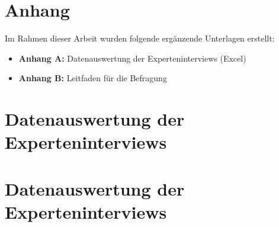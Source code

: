 \chapter{Anhang}
\label{ch:anhang}

Im Rahmen dieser Arbeit wurden folgende ergänzende Unterlagen erstellt:

\begin{itemize}
    \item \textbf{Anhang A:} Datenauswertung der Experteninterviews (Excel)
    \item \textbf{Anhang B:} Leitfaden für die Befragung
\end{itemize}

\newpage

\chapter{Datenauswertung der Experteninterviews}
\label{app:codierte_passagen}


\chapter{Datenauswertung der Experteninterviews}
\label{app:codierte_passagen}

